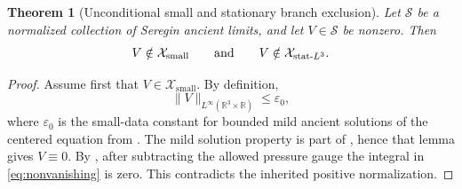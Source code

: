 \documentclass[11pt]{amsart}
\theoremstyle{plain}
\newtheorem{theorem}{Theorem}[section]
\theoremstyle{definition}
\theoremstyle{remark}
\numberwithin{equation}{section}
\begin{document}
\begin{theorem}[Unconditional small and stationary branch exclusion]
\label{thm:classical-closed-branches}
Let \(\mathcal S\) be a normalized collection of Seregin ancient limits, and
let \(V\in\mathcal S\) be nonzero.  Then
\[
   V\notin\mathcal X_{\mathrm{small}}
   \qquad\hbox{and}\qquad
   V\notin\mathcal X_{\mathrm{stat}\text{-}L^3}.
\]
\end{theorem}

\begin{proof}
Assume first that \(V\in\mathcal X_{\mathrm{small}}\).  By definition,
\[
   \|V\|_{L^\infty(\mathbb R^3\times\mathbb R)}\le\varepsilon_0 ,
\]
where \(\varepsilon_0\) is the small-data constant for bounded mild ancient
solutions of the centered equation from .  The mild
solution property is part of , hence that lemma
gives \(V\equiv0\).  By , after subtracting
the allowed pressure gauge the integral in \eqref{eq:nonvanishing} is zero.
This contradicts the inherited positive normalization.


\end{proof}
\end{document}
